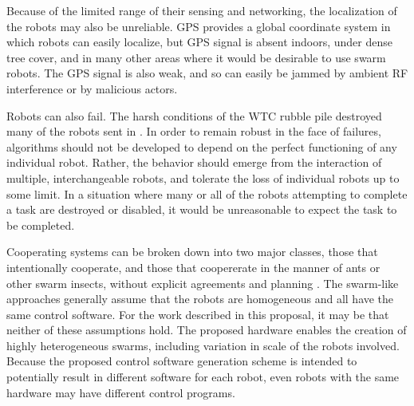 Because of the limited range of their sensing and networking, the localization of the robots may also be unreliable. 
GPS provides a global coordinate system in which robots can easily localize, but GPS signal is absent indoors, under dense tree cover, and in many other areas where it would be desirable to use swarm robots. 
The GPS signal is also weak, and so can easily be jammed by ambient RF interference or by malicious actors. 

Robots can also fail. 
The harsh conditions of the WTC rubble pile destroyed many of the robots sent in \citep{Micire02analysisof}.
In order to remain robust in the face of failures, algorithms should not be developed to depend on the perfect functioning of any individual robot. 
Rather, the behavior should emerge from the interaction of multiple, interchangeable robots, and tolerate the loss of individual robots up to some limit. 
In a situation where many or all of the robots attempting to complete a task are destroyed or disabled, it would be unreasonable to expect the task to be completed.

Cooperating systems can be broken down into two major classes, those that intentionally cooperate, and those that coopererate in the manner of ants or other swarm insects, without explicit agreements and planning \citep{parker1998alliance}.
The swarm-like approaches generally assume that the robots are homogeneous and all have the same control software. 
For the work described in this proposal, it may be that neither of these assumptions hold. 
The proposed hardware enables the creation of highly heterogeneous swarms, including variation in scale of the robots involved. 
Because the proposed control software generation scheme is intended to potentially result in different software for each robot, even robots with the same hardware may have different control programs. 

